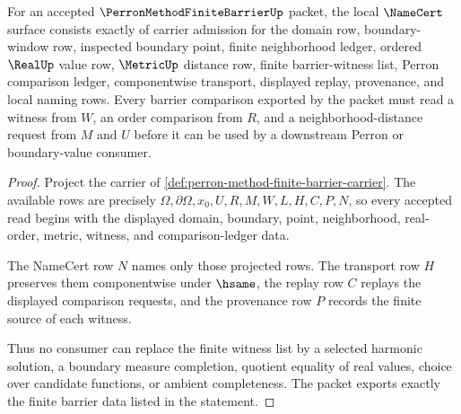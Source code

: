 \begin{theorem}
\label{thm:perron-method-finite-barrier-namecert-obligations}
For an accepted $\PerronMethodFiniteBarrierUp$ packet, the local $\NameCert$ surface consists exactly of carrier admission for the domain row, boundary-window row, inspected boundary point, finite neighborhood ledger, ordered $\RealUp$ value row, $\MetricUp$ distance row, finite barrier-witness list, Perron comparison ledger, componentwise transport, displayed replay, provenance, and local naming rows. Every barrier comparison exported by the packet must read a witness from $W$, an order comparison from $R$, and a neighborhood-distance request from $M$ and $U$ before it can be used by a downstream Perron or boundary-value consumer.
\end{theorem}
\begin{proof}
Project the carrier of \autoref{def:perron-method-finite-barrier-carrier}. The available rows are precisely $\Omega,\partial\Omega,x_0,U,R,M,W,L,H,C,P,N$, so every accepted read begins with the displayed domain, boundary, point, neighborhood, real-order, metric, witness, and comparison-ledger data.

The NameCert row $N$ names only those projected rows. The transport row $H$ preserves them componentwise under $\hsame$, the replay row $C$ replays the displayed comparison requests, and the provenance row $P$ records the finite source of each witness.

Thus no consumer can replace the finite witness list by a selected harmonic solution, a boundary measure completion, quotient equality of real values, choice over candidate functions, or ambient completeness. The packet exports exactly the finite barrier data listed in the statement.
\end{proof}

